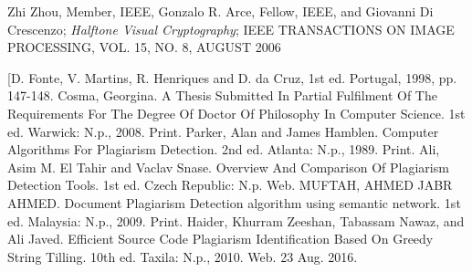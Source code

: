 \begin{thebibliography}{99}
 Zhi Zhou, Member, IEEE, Gonzalo R. Arce, Fellow, IEEE, and Giovanni Di Crescenzo; \emph{Halftone Visual Cryptography}; IEEE TRANSACTIONS ON IMAGE PROCESSING, VOL. 15, NO. 8, AUGUST 2006

[D. Fonte, V. Martins, R. Henriques and D. da Cruz, 1st ed. Portugal, 1998, pp. 147-148.
Cosma, Georgina. A Thesis Submitted In Partial Fulfilment Of The Requirements For The Degree Of Doctor Of Philosophy In Computer Science. 1st ed. Warwick: N.p., 2008. Print.
Parker, Alan and James Hamblen. Computer Algorithms For Plagiarism Detection. 2nd ed. Atlanta: N.p., 1989. Print.
Ali, Asim M. El Tahir and Vaclav Snase. Overview And Comparison Of Plagiarism Detection Tools. 1st ed. Czech Republic: N.p. Web.
MUFTAH, AHMED JABR AHMED. Document Plagiarism Detection algorithm using semantic network. 1st ed. Malaysia: N.p., 2009. Print.
Haider, Khurram Zeeshan, Tabassam Nawaz, and Ali Javed. Efficient Source Code Plagiarism Identification Based On Greedy String Tilling. 10th ed. Taxila: N.p., 2010. Web. 23 Aug. 2016.

\end{thebibliography}
